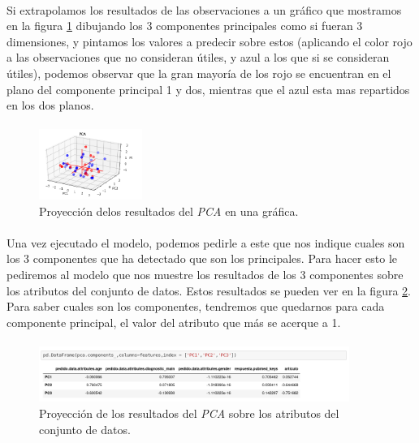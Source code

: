 \documentclass[10pt,a4paper,oneside]{book}
\begin{document}
\newpage
\paragraph{}
Si extrapolamos los resultados de las observaciones a un gráfico que mostramos en la figura \ref{pcaOneGraphic} dibujando los 3 componentes principales como si fueran 3 dimensiones, y pintamos los valores a predecir sobre estos (aplicando el color rojo a las observaciones que no consideran útiles, y azul a los que si se consideran útiles), podemos observar que la gran mayoría de los rojo se encuentran en el plano del componente principal 1 y dos, mientras que el azul esta mas repartidos en los dos planos.

\paragraph{}
\begin{figure}[!htb]
  \centering
    \includegraphics[width=0.3\textwidth]{images/metodologia_procesado_de_datos_pca1_graphic.png}
    \caption{Proyección delos resultados del \textit{PCA} en una gráfica.}
  \label{pcaOneGraphic}
\end{figure}

\paragraph{}
Una vez ejecutado el modelo, podemos pedirle a este que nos indique cuales son los 3 componentes que ha detectado que son los principales. Para hacer esto le pediremos al modelo que nos muestre los resultados de los 3 componentes sobre los atributos del conjunto de datos. Estos resultados se pueden ver en la figura \ref{pcaOneAtributos}. Para saber cuales son los componentes, tendremos que quedarnos para cada componente principal, el valor del atributo que más se acerque a 1.

\paragraph{}
\begin{figure}[!htb]
  \centering
    \includegraphics[width=0.9\textwidth]{images/metodologia_procesado_de_datos_pca1_atributos.png}
    \caption{Proyección de los resultados del \textit{PCA} sobre los atributos del conjunto de datos.}
  \label{pcaOneAtributos}
\end{figure}
\end{document}
